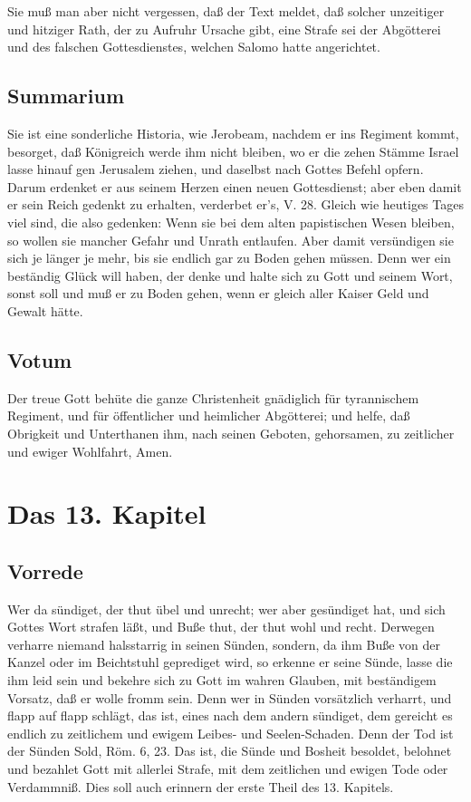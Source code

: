 Sie muß man aber nicht vergessen, daß der Text meldet, daß solcher unzeitiger und hitziger Rath, der zu Aufruhr Ursache gibt, eine Strafe sei der Abgötterei und des falschen Gottesdienstes, welchen Salomo hatte angerichtet.

\section{Summarium}

Sie ist eine sonderliche Historia, wie Jerobeam, nachdem er ins Regiment kommt, besorget, daß Königreich werde ihm nicht bleiben, wo er die zehen Stämme Israel lasse hinauf gen Jerusalem ziehen, und daselbst nach Gottes Befehl opfern. Darum erdenket er aus seinem Herzen einen neuen Gottesdienst; aber eben
damit er sein Reich gedenkt zu erhalten, verderbet er’s, V. 28. Gleich wie heutiges Tages viel sind, die also gedenken: Wenn sie bei dem alten papistischen Wesen bleiben, so wollen sie mancher Gefahr und Unrath entlaufen. Aber damit versündigen sie sich je länger je mehr, bis sie endlich gar zu Boden gehen müssen. Denn wer ein beständig Glück will haben, der denke und halte sich zu Gott und seinem Wort, sonst soll und muß er zu Boden gehen, wenn er gleich aller Kaiser Geld und Gewalt hätte.

\section{Votum}

Der treue Gott behüte die ganze Christenheit gnädiglich für tyrannischem Regiment, und für öffentlicher und heimlicher Abgötterei; und helfe, daß Obrigkeit und Unterthanen ihm, nach seinen Geboten, gehorsamen, zu zeitlicher und ewiger Wohlfahrt, Amen.

\chapter{Das 13. Kapitel}

\section{Vorrede}

Wer da sündiget, der thut übel und unrecht; wer aber gesündiget hat, und sich Gottes Wort strafen läßt, und Buße thut, der thut wohl und recht. Derwegen verharre niemand halsstarrig in seinen Sünden, sondern, da ihm Buße von der Kanzel oder im Beichtstuhl geprediget wird, so erkenne er seine Sünde, lasse die ihm leid sein und bekehre sich zu Gott im wahren Glauben, mit beständigem Vorsatz, daß er wolle fromm sein. Denn wer in Sünden vorsätzlich verharrt, und flapp auf flapp schlägt, das ist, eines nach dem andern sündiget, dem gereicht es endlich zu zeitlichem und ewigem Leibes- und Seelen-Schaden. Denn der Tod ist der Sünden Sold, Röm. 6, 23. Das ist, die Sünde und Bosheit besoldet, belohnet und bezahlet Gott mit allerlei Strafe, mit dem zeitlichen und ewigen Tode oder Verdammniß. Dies soll auch erinnern der erste Theil des 13. Kapitels.

